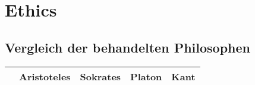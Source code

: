 \section{Ethics}

	\subsection{Vergleich der behandelten Philosophen}
		\begin{longtable}{|l|l|l|l|l|}
			\hline
				& Aristoteles & Sokrates & Platon & Kant \\
			\hline
		\end{longtable}
